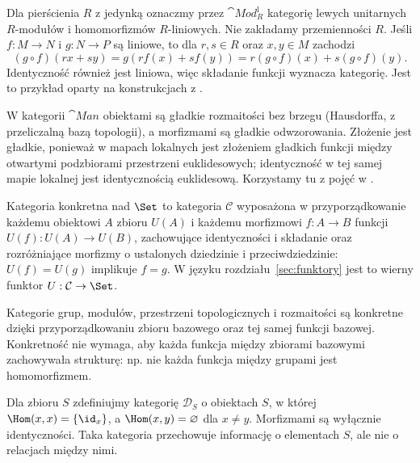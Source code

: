 \begin{przyklad}\label{cat:ex:moduly-rozmaitosci}
Dla pierścienia $R$ z jedynką oznaczmy przez $\cat{Mod}_R^{\mathrm{l}}$ kategorię lewych unitarnych $R$-modułów i homomorfizmów $R$-liniowych. Nie zakładamy przemienności $R$. Jeśli $f:M\to N$ i $g:N\to P$ są liniowe, to dla $r,s\in R$ oraz $x,y\in M$ zachodzi
\[
(g\circ f)(rx+sy)=g(rf(x)+sf(y))
=r(g\circ f)(x)+s(g\circ f)(y).
\]
Identyczność również jest liniowa, więc składanie funkcji wyznacza kategorię. Jest to przykład oparty na konstrukcjach z .

W kategorii $\cat{Man}$ obiektami są gładkie rozmaitości bez brzegu (Hausdorffa, z przeliczalną bazą topologii), a morfizmami są gładkie odwzorowania. Złożenie jest gładkie, ponieważ w mapach lokalnych jest złożeniem gładkich funkcji między otwartymi podzbiorami przestrzeni euklidesowych; identyczność w tej samej mapie lokalnej jest identycznością euklidesową. Korzystamy tu z pojęć w .
\end{przyklad}

\begin{definicja}\label{cat:def:konkretna}
Kategoria konkretna nad $\Set$ to kategoria $\mathcal C$ wyposażona w przyporządkowanie każdemu obiektowi $A$ zbioru $U(A)$ i każdemu morfizmowi $f:A\to B$ funkcji $U(f):U(A)\to U(B)$, zachowujące identyczności i składanie oraz rozróżniające morfizmy o ustalonych dziedzinie i przeciwdziedzinie: $U(f)=U(g)$ implikuje $f=g$. W języku rozdziału~\ref{sec:funktory} jest to wierny funktor $U:\mathcal C\to\Set$.
\end{definicja}

\begin{przyklad}
Kategorie grup, modułów, przestrzeni topologicznych i rozmaitości są konkretne dzięki przyporządkowaniu zbioru bazowego oraz tej samej funkcji bazowej. Konkretność nie wymaga, aby każda funkcja między zbiorami bazowymi zachowywała strukturę: np. nie każda funkcja między grupami jest homomorfizmem.
\end{przyklad}

\begin{przyklad}
Dla zbioru $S$ zdefiniujmy kategorię $\mathcal D_S$ o obiektach $S$, w której $\Hom(x,x)=\{\id_x\}$, a $\Hom(x,y)=\varnothing$ dla $x\neq y$. Morfizmami są wyłącznie identyczności. Taka kategoria przechowuje informację o elementach $S$, ale nie o relacjach między nimi.
\end{przyklad}

